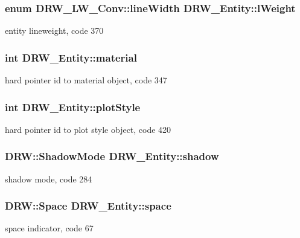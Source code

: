 \subsubsection[{l\+Weight}]{\setlength{\rightskip}{0pt plus 5cm}enum {\bf D\+R\+W\+\_\+\+L\+W\+\_\+\+Conv\+::line\+Width} D\+R\+W\+\_\+\+Entity\+::l\+Weight}\label{class_d_r_w___entity_a5e01429ed3b7199b17367a5c85970a0d}
entity lineweight, code 370 \hypertarget{class_d_r_w___entity_a29c774531a5109cedc01eed7f2822f76}{}
\subsubsection[{material}]{\setlength{\rightskip}{0pt plus 5cm}int D\+R\+W\+\_\+\+Entity\+::material}\label{class_d_r_w___entity_a29c774531a5109cedc01eed7f2822f76}
hard pointer id to material object, code 347 \hypertarget{class_d_r_w___entity_abebf612b67fe860b34163f8cc16f0e78}{}
\subsubsection[{plot\+Style}]{\setlength{\rightskip}{0pt plus 5cm}int D\+R\+W\+\_\+\+Entity\+::plot\+Style}\label{class_d_r_w___entity_abebf612b67fe860b34163f8cc16f0e78}
hard pointer id to plot style object, code 420 \hypertarget{class_d_r_w___entity_add69fd0a0f9ac49dfc5aca84c3023c56}{}
\subsubsection[{shadow}]{\setlength{\rightskip}{0pt plus 5cm}D\+R\+W\+::\+Shadow\+Mode D\+R\+W\+\_\+\+Entity\+::shadow}\label{class_d_r_w___entity_add69fd0a0f9ac49dfc5aca84c3023c56}
shadow mode, code 284 \hypertarget{class_d_r_w___entity_a8baf5455459e70a668e59fd13cfa72e2}{}
\subsubsection[{space}]{\setlength{\rightskip}{0pt plus 5cm}D\+R\+W\+::\+Space D\+R\+W\+\_\+\+Entity\+::space}\label{class_d_r_w___entity_a8baf5455459e70a668e59fd13cfa72e2}
space indicator, code 67 \hypertarget{class_d_r_w___entity_a3706fb94037a61f8a4b705210b136117}{}
